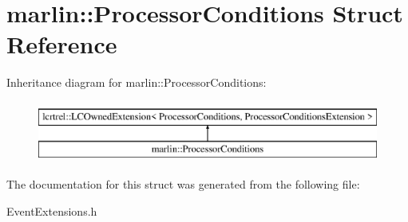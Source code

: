 \section{marlin\+:\+:Processor\+Conditions Struct Reference}
\label{structmarlin_1_1ProcessorConditions}
Inheritance diagram for marlin\+:\+:Processor\+Conditions\+:\begin{figure}[H]
\begin{center}
\leavevmode
\includegraphics[height=2.000000cm]{structmarlin_1_1ProcessorConditions}
\end{center}
\end{figure}


The documentation for this struct was generated from the following file\+:\begin{DoxyCompactItemize}
\item 
Event\+Extensions.\+h\end{DoxyCompactItemize}
